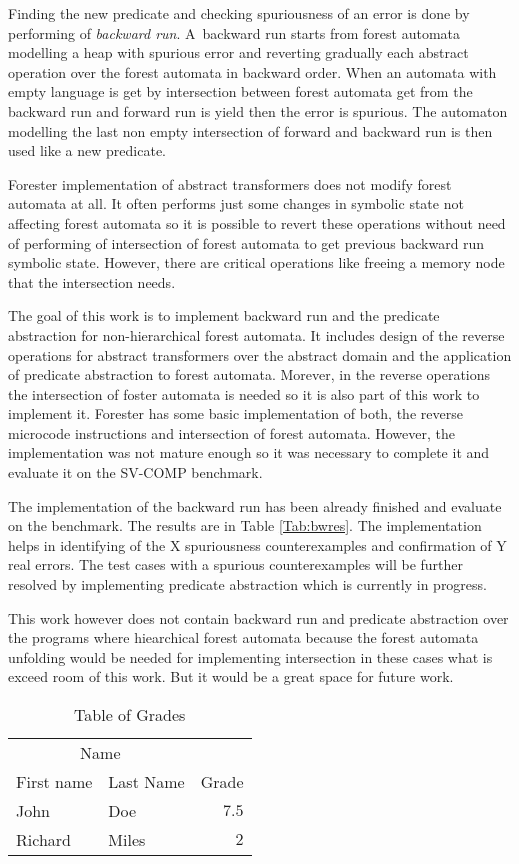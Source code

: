 \documentclass[fleqn,11pt]{ExcelAtFIT} %
\begin{document}
Finding the new predicate and checking spuriousness of an error is done by performing of \emph{backward run}.
A~backward run starts from forest automata modelling a heap with spurious error and
reverting gradually each abstract operation over the forest automata
in backward order.
When an automata with empty language is get by intersection between forest automata
get from the backward run and forward run is yield then the error is spurious.
The automaton modelling the last non empty intersection of forward and backward run
is then used like a new predicate.

Forester implementation of abstract transformers does not modify
forest automata at all.
It often performs just some changes in symbolic state not
affecting forest automata so it is possible to revert these operations without
need of performing of intersection of forest automata to get previous backward
run symbolic state.
However, there are critical operations like freeing a memory node that the intersection
needs.

The goal of this work is to implement backward run and the predicate abstraction
for non-hierarchical forest automata.
It includes design of the reverse operations for abstract transformers over
the abstract domain and the application of predicate abstraction to forest automata.
Morever, in the reverse operations the intersection of foster automata is needed
so it is also part of this work to implement it.
Forester has some basic implementation of both, the reverse microcode instructions and
intersection of forest automata.
However, the implementation was not mature enough so it was necessary to
complete it and evaluate it on the SV-COMP benchmark.

The implementation of the backward run has been already finished
and evaluate on the benchmark.
The results are in Table \ref{Tab:bwres}.
The implementation helps in identifying of the X spuriousness counterexamples and
confirmation of Y real errors.
The test cases with a spurious counterexamples will be further resolved by implementing predicate
abstraction which is currently in progress.

This work however does not contain backward run and predicate abstraction over
the programs where hiearchical forest automata because the forest automata unfolding
would be needed for implementing intersection in these cases
what is exceed room of this work.
But it would be a great space for future work.

\begin{table}[h]
	\vskip6pt
	\caption{Table of Grades}
	\centering
	\begin{tabular}{llr}
		\toprule
		\multicolumn{2}{c}{Name} \\
		\cmidrule(r){1-2}
		First name & Last Name & Grade \\
		\midrule
		John & Doe & $7.5$ \\
		Richard & Miles & $2$ \\
		\bottomrule
	\end{tabular}
	\label{tab:ExampleTable}
\end{table}
\end{document}
